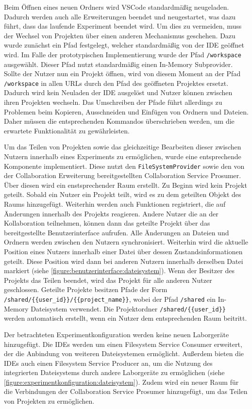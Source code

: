 Beim Öffnen eines neuen Ordners wird VSCode standardmäßig neugeladen. Dadurch werden auch alle Erweiterungen beendet und neugestartet, was dazu führt, dass das laufende Experiment beendet wird. Um dies zu vermeiden, muss der Wechsel von Projekten über einen anderen Mechanismus geschehen. Dazu wurde zunächst ein Pfad festgelegt, welcher standardmäßig von der IDE geöffnet wird. Im Falle der prototypischen Implementierung wurde der Pfad \texttt{/workspace} ausgewählt. Dieser Pfad nutzt standardmäßig einen In-Memory Subprovider. Sollte der Nutzer nun ein Projekt öffnen, wird von diesem Moment an der Pfad \texttt{/workspace} in allen URLs durch den Pfad des geöffneten Projektes ersetzt. Dadurch wird kein Neuladen der IDE ausgelöst und Nutzer können zwischen ihren Projekten wechseln. Das Umschreiben der Pfade führt allerdings zu Problemen beim Kopieren, Ausschneiden und Einfügen von Ordnern und Dateien. Daher müssen die entsprechenden Kommandos überschrieben werden, um die erwartete Funktionalität zu gewährleisten.

Um das Teilen von Projekten sowie das gleichzeitige Bearbeiten dieser zwischen Nutzern innerhalb eines Experiments zu ermöglichen, wurde eine entsprechende Komponente implementiert. Diese nutzt den \texttt{FileSystemProvider} sowie den von der Collaboration Erweiterung bereitgestellten Collaboration Service Prosumer. Über diesen wird ein enstsprechender Raum erstellt. Zu Beginn wird kein Projekt geteilt. Sobald ein Nutzer ein Projekt teilt, wird es zu dem geteilten Objekt des Raums hinzugefügt. Weiterhin werden auch Funktionen registriert, die auf Änderungen innerhalb des Projekts reagieren. Andere Nutzer die an der Kollaboration teilnehmen, können dann das geteilte Projekt über das bereitgestellte Benutzerinterface aufrufen. Alle Änderungen an Dateien und Ordnern werden zwischen den Nutzern synchronisiert. Weiterhin wird die aktuelle Position eines Nutzers innerhalb einer Datei über dessen Zustandsinformationen geteilt. Diese Position wird dann bei anderen Nutzern innerhalb derselben Datei markiert (siehe \autoref{figure:benutzerinterface:dateisystem}). Wenn der Besitzer des Projekts das Teilen beendet, wird das Projekt für alle anderen Nutzer geschlossen. Geteilte Projekte besitzen Pfade der Form \texttt{/shared/\{\{user\_id\}\}/\{\{project\_name\}\}}, wobei der Pfad \texttt{/shared} ein In-Memory Dateisystem verwendet. Die Projektordner \texttt{/shared/\{\{user\_id\}\}} werden automatisch erstellt, wenn ein Nutzer dem entsprechenden Raum beitritt.

Der betrachteten Experimentkonfiguration werden keine neuen Laborgeräte hinzugefügt. Die IDEs werden um einen Filesystem Service Consumer erweitert, der die Anbindung von weiteren Dateisystemen ermöglicht. Außerdem bieten die IDEs auch einen Filesystem Service Producer an, um die Nutzung des integrierten Dateisystems durch andere Laborgeräte zu ermöglichen (siehe \autoref{figure:experimentkonfiguration:dateisystem}). Zudem wird ein neuer Raum für die Verbindungen der Collaboration Service Prosumer hinzugefügt, um das Teilen von Projekten zu ermöglichen.